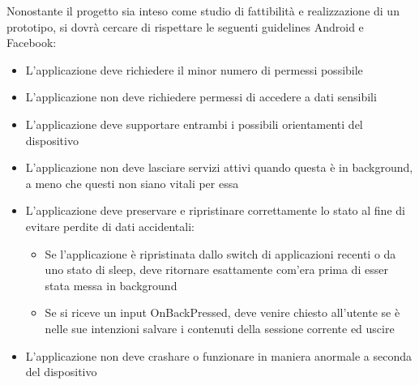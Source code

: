 Nonostante il progetto sia inteso come studio di fattibilità e realizzazione di un prototipo, si dovrà cercare di rispettare le seguenti guidelines Android e Facebook:
\begin{itemize}
\item L'applicazione deve richiedere il minor numero di permessi possibile
\item L'applicazione non deve richiedere permessi di accedere a dati sensibili
\item L'applicazione deve supportare entrambi i possibili orientamenti del dispositivo
\item L'applicazione non deve lasciare servizi attivi quando questa è in background, a meno che questi non siano vitali per essa
\item L'applicazione deve preservare e ripristinare correttamente lo stato al fine di evitare perdite di dati accidentali:
\begin{itemize}
\item Se l'applicazione è ripristinata dallo switch di applicazioni recenti o da uno stato di sleep, deve ritornare esattamente com'era prima di esser stata messa in background
\item Se si riceve un input OnBackPressed, deve venire chiesto all'utente se è nelle sue intenzioni salvare i contenuti della sessione corrente ed uscire
\end{itemize}
\item L'applicazione non deve crashare o funzionare in maniera anormale a seconda del dispositivo
\end{itemize}



